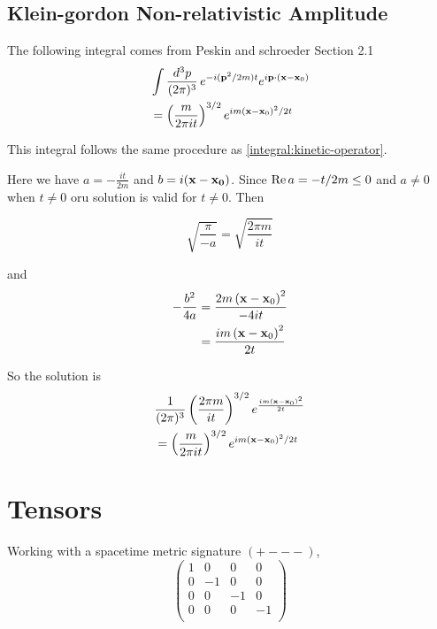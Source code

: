 
\subsection{Klein-gordon Non-relativistic Amplitude} \label{ps-kg:nonrelativistic-propagator}

The following integral comes from Peskin and schroeder Section 2.1
\begin{align}
& \int \frac{d^3p}{(2\pi)^3} \, e^{-i(\boldsymbol{\mathbf{p}}^2/2m)t} e^{i\boldsymbol{\mathbf{p}}\cdot(\boldsymbol{\mathbf{x}}-\boldsymbol{\mathbf{x}}_0)} \label{kg:nonrelativistic-03} \\
&= \left( \frac{m}{2\pi i t} \right)^{3/2} e^{im (\boldsymbol{\mathbf{x}}-\boldsymbol{\mathbf{x}}_0)^2 /2t} \label{kg:nonrelativistic-04}
\end{align}

This integral follows the same procedure as \ref{integral:kinetic-operator}.

Here we have $a = -\frac{it}{2m}$ and $b = i(\boldsymbol{\mathbf{x}}-\boldsymbol{\mathbf{x_0}})$.
Since $\operatorname{Re}{a} = -t/2m \leq 0$ and $a\neq 0$ when $t\neq 0$ oru solution is valid for $t\neq 0$.
Then

$$
\sqrt{ \frac{\pi}{-a} } = \sqrt{ \frac{2\pi m}{it} }
$$

and
\begin{align*}
-\frac{b^2}{4a} &= \frac{2m \left(\boldsymbol{\mathbf{x}}-\boldsymbol{\mathbf{x}}_0\right)^2}{-4it} \\
&= \frac{im \left(\boldsymbol{\mathbf{x}}-\boldsymbol{\mathbf{x}}_0\right)^2}{2t}
\end{align*}

So the solution is
\begin{align*}
& \frac{1}{(2\pi)^3} \left( \frac{2\pi m}{it} \right)^{3/2} e^{\frac{im \left(\boldsymbol{\mathbf{x}}-\boldsymbol{\mathbf{x}}_0\right)^2}{2t}} \\
&= \left( \frac{m}{2\pi it} \right)^{3/2} e^{im \left(\boldsymbol{\mathbf{x}}-\boldsymbol{\mathbf{x}}_0\right)^2 /2t}
\end{align*}







\section{Tensors}

Working with a spacetime metric signature $(+ - - -)$,
$$
\begin{pmatrix}
    1 & 0  & 0  & 0  \\
    0 & -1 & 0  & 0  \\
    0 & 0  & -1 & 0  \\
    0 & 0  & 0  & -1 \\
\end{pmatrix}
$$

